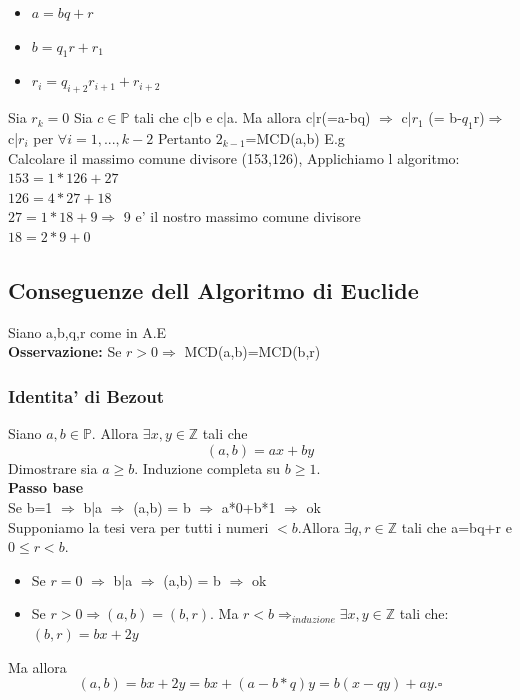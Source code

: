 \documentclass{article}
\begin{document}
\begin{flushleft}
        \begin{itemize}
          \item $a=bq+r$
          \item $b=q_1r+r_1$
          \item $r_i=q_{i+2}r_{i+1}+r_{i+2}$
        \end{itemize}
        Sia $r_k=0$ Sia $c\in \mathbb{P}$ tali che c|b e c|a. Ma allora c|r(=a-bq) $\Rightarrow$ c|$r_1$ (= b-$q_1$r)$\Rightarrow$ c|$r_i$ per
        $\forall i=1,...,k-2$ Pertanto $2_{k-1}$=MCD(a,b)
        E.g \\ 
        Calcolare il massimo comune divisore (153,126), Applichiamo l algoritmo:
        $153=1*126+27$ \\ 
        $126=4*27+18$ \\
        $27=1*18+9 \Rightarrow$ 9 e' il nostro massimo comune divisore \\
        $18=2*9+0$ \\
    \end{flushleft}
    \subsection{Conseguenze dell Algoritmo di Euclide}
    \begin{flushleft}
     Siano a,b,q,r come in A.E  \\ 
      \textbf{Osservazione:} Se $r>0 \Rightarrow$ MCD(a,b)=MCD(b,r)
    \end{flushleft}
    \subsubsection{Identita' di Bezout}
    \begin{flushleft}
      Siano $a,b \in \mathbb{P}.$ Allora $\exists x,y \in \mathbb{Z}$ tali che
      \begin{equation}
        (a,b)=ax+by
      \end{equation}
      Dimostrare sia $a\geq b$. Induzione completa su $b\geq 1$. \\ 
      \textbf{Passo base} \\ 
      Se b=1 $\Rightarrow$ b|a $\Rightarrow$ (a,b) = b $\Rightarrow$ a*0+b*1 $\Rightarrow$ ok \\
      Supponiamo la tesi vera per tutti i numeri $<b$.Allora $\exists q,r \in \mathbb{Z}$ tali che a=bq+r e $0\leq r < b$.
      \begin{itemize}
        \item Se $r=0$ $\Rightarrow$ b|a $\Rightarrow$ (a,b) = b $\Rightarrow$ ok
        \item Se $r>0  \Rightarrow (a,b)=(b,r).$ Ma $r<b \Rightarrow_{induzione} \exists x,y \in \mathbb{Z}$ tali che: $(b,r)=bx+2y$
      \end{itemize}
      Ma allora
      \begin{equation}
        (a,b)=bx+2y=bx+(a-b*q)y=b(x-qy)+ay. \square
      \end{equation}
    \end{flushleft}
\end{document}
